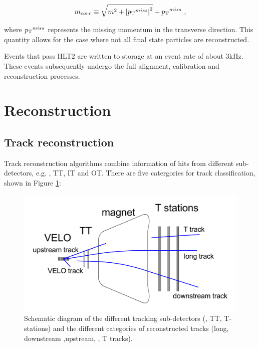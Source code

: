 \begin{equation}
m_{corr} \equiv \sqrt{m^2 + {| \mbox{$p_{\mathrm{ T}}$}^{miss} |}^2} + \mbox{$p_{\mathrm{ T}}$}^{miss} \text{ ,}
\end{equation}

where $\mbox{$p_{\mathrm{ T}}$}^{miss}$ represents the missing momentum in the transverse direction. This quantity allows for the case where not all final state particles are reconstructed. 

Events that pass HLT2 are written to storage at an event rate of about 3kHz. These events subsequently undergo the full alignment, calibration and reconstruction processes.

\section{Reconstruction}

\subsection{Track reconstruction}

Track reconstruction algorithms combine information of hits from different sub-detectors, e.g. \velo, TT, IT and OT. There are five catergories for track classification, shown in Figure \ref{tracktypes}:

\begin{figure}[h]
\includegraphics[width=\linewidth]{figures/detector/tracktypes.pdf}
\caption{Schematic diagram of the different tracking sub-detectors (\velo, TT, T-stations) and the different categories of reconstructed tracks (long, downstream ,upstream, \velo, T tracks).}
\label{tracktypes}
\end{figure}

